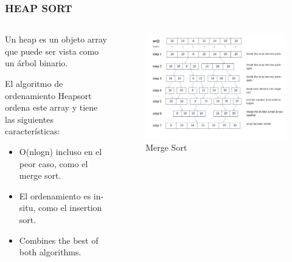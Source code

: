 \documentclass[
	11pt, %
]{beamer}
\begin{document}
\begin{frame}
	\frametitle{HEAP SORT}
    \begin{columns}[t] %
		\begin{column}{0.45\textwidth} %
            Un heap es un objeto array que puede ser vista como un árbol binario.

            El algoritmo de ordenamiento Heapsort ordena este array y tiene las siguientes características:
            \begin{itemize}
              \item O(nlogn) incluso en el peor caso, como el merge sort.
              \item El ordenamiento es in-situ, como el insertion sort.
              \item Combines the best of both algorithms.
            \end{itemize}
		\end{column}		
		\begin{column}{0.5\textwidth} %
			\begin{figure}
		      \includegraphics[width=0.8\linewidth]{mergesort.png}
		      \caption{Merge Sort}
	   \end{figure}
		
		\end{column}
	\end{columns}
\end{frame}
\end{document}

